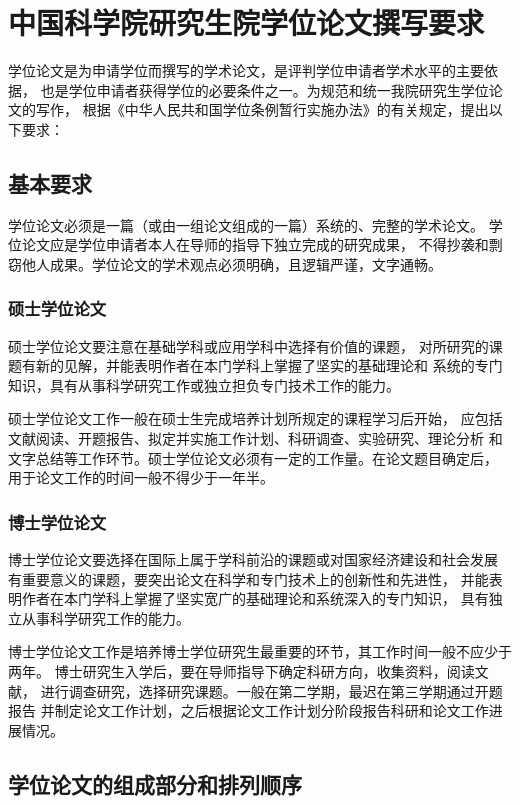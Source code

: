 
\chapter{中国科学院研究生院学位论文撰写要求}
\label{chap:requires}

学位论文是为申请学位而撰写的学术论文，是评判学位申请者学术水平的主要依据，
也是学位申请者获得学位的必要条件之一。为规范和统一我院研究生学位论文的写作，
根据《中华人民共和国学位条例暂行实施办法》的有关规定，提出以下要求：

\section{基本要求}

学位论文必须是一篇（或由一组论文组成的一篇）系统的、完整的学术论文。
学位论文应是学位申请者本人在导师的指导下独立完成的研究成果，
不得抄袭和剽窃他人成果。学位论文的学术观点必须明确，且逻辑严谨，文字通畅。

\subsection{硕士学位论文}

硕士学位论文要注意在基础学科或应用学科中选择有价值的课题，
对所研究的课题有新的见解，并能表明作者在本门学科上掌握了坚实的基础理论和
系统的专门知识，具有从事科学研究工作或独立担负专门技术工作的能力。

硕士学位论文工作一般在硕士生完成培养计划所规定的课程学习后开始，
应包括文献阅读、开题报告、拟定并实施工作计划、科研调查、实验研究、理论分析
和文字总结等工作环节。硕士学位论文必须有一定的工作量。在论文题目确定后，
用于论文工作的时间一般不得少于一年半。

\subsection{博士学位论文}

博士学位论文要选择在国际上属于学科前沿的课题或对国家经济建设和社会发展
有重要意义的课题，要突出论文在科学和专门技术上的创新性和先进性，
并能表明作者在本门学科上掌握了坚实宽广的基础理论和系统深入的专门知识，
具有独立从事科学研究工作的能力。

博士学位论文工作是培养博士学位研究生最重要的环节，其工作时间一般不应少于两年。
博士研究生入学后，要在导师指导下确定科研方向，收集资料，阅读文献，
进行调查研究，选择研究课题。一般在第二学期，最迟在第三学期通过开题报告
并制定论文工作计划，之后根据论文工作计划分阶段报告科研和论文工作进展情况。

\section{学位论文的组成部分和排列顺序}

